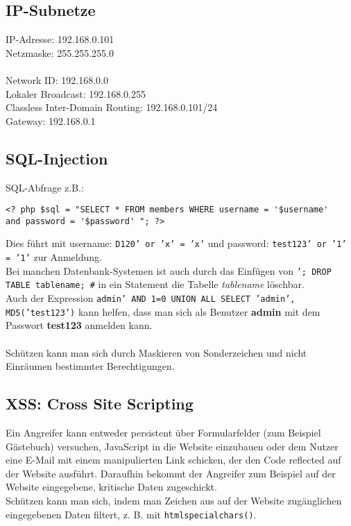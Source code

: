\subsection{IP-Subnetze}
IP-Adresse: 192.168.0.101\\
Netzmaske: 255.255.255.0\\\\
Network ID: 192.168.0.0\\
Lokaler Broadcast: 192.168.0.255\\
Classless Inter-Domain Routing: 192.168.0.101/24\\
Gateway: 192.168.0.1


\subsection{SQL-Injection}
SQL-Abfrage z.B.:
\begin{lstlisting}
<? php $sql = "SELECT * FROM members WHERE username = '$username'
and password = '$password' "; ?>
				\end{lstlisting}
Dies führt mit username: \texttt{D120' or 'x' = 'x'} und password: \texttt{test123' or '1' = '1'} zur Anmeldung.\\
Bei manchen Datenbank-Systemen ist auch durch das Einfügen von \texttt{'; DROP TABLE tablename; \#} in ein Statement die Tabelle \textit{tablename} löschbar.\\
Auch der Expression \texttt{admin' AND 1=0 UNION ALL SELECT
	'admin', MD5('test123')} kann helfen, dass man sich als Benutzer \textbf{admin} mit dem Passwort \textbf{test123} anmelden kann.\\\\Schützen kann man sich durch Maskieren von Sonderzeichen und nicht Einräumen bestimmter Berechtigungen.

\subsection{XSS: Cross Site Scripting}
Ein Angreifer kann entweder persistent über Formularfelder (zum Beispiel Gästebuch) versuchen, JavaScript in die Website einzubauen oder dem Nutzer eine E-Mail mit einem manipulierten Link schicken, der den Code reflected auf der Website ausführt. Daraufhin bekommt der Angreifer zum Beispiel auf der Website eingegebene, kritische Daten zugeschickt.\\
Schützen kann man sich, indem man Zeichen aus auf der Website zugänglichen eingegebenen Daten filtert, z. B. mit \texttt{htmlspecialchars()}.


